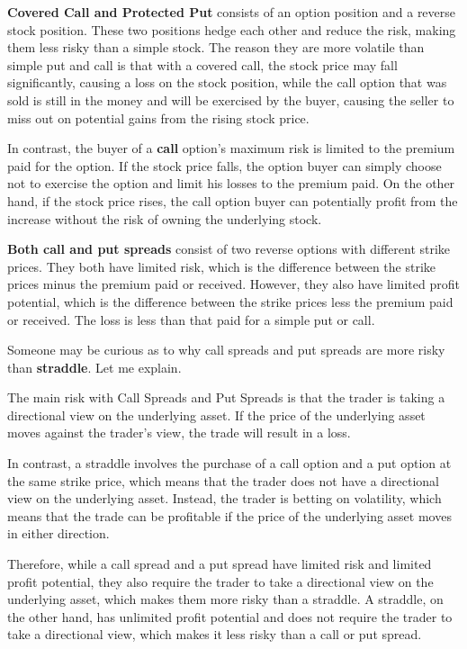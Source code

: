 \documentclass[11pt,en]{elegantpaper}
\begin{document}
\textbf{Covered Call and Protected Put} consists of an option position and a reverse stock position. These two positions hedge each other and reduce the risk, making them less risky than a simple stock. The reason they are more volatile than simple put and call is that with a covered call, the stock price may fall significantly, causing a loss on the stock position, while the call option that was sold is still in the money and will be exercised by the buyer, causing the seller to miss out on potential gains from the rising stock price.

In contrast, the buyer of a \textbf{call} option's maximum risk is limited to the premium paid for the option. If the stock price falls, the option buyer can simply choose not to exercise the option and limit his losses to the premium paid. On the other hand, if the stock price rises, the call option buyer can potentially profit from the increase without the risk of owning the underlying stock.

\textbf{Both call and put spreads} consist of two reverse options with different strike prices. They both have limited risk, which is the difference between the strike prices minus the premium paid or received. However, they also have limited profit potential, which is the difference between the strike prices less the premium paid or received. The loss is less than that paid for a simple put or call. 

Someone may be curious as to why call spreads and put spreads are more risky than \textbf{straddle}. Let me explain. 

The main risk with Call Spreads and Put Spreads is that the trader is taking a directional view on the underlying asset. If the price of the underlying asset moves against the trader's view, the trade will result in a loss. 

In contrast, a straddle involves the purchase of a call option and a put option at the same strike price, which means that the trader does not have a directional view on the underlying asset. Instead, the trader is betting on volatility, which means that the trade can be profitable if the price of the underlying asset moves in either direction.

Therefore, while a call spread and a put spread have limited risk and limited profit potential, they also require the trader to take a directional view on the underlying asset, which makes them more risky than a straddle. A straddle, on the other hand, has unlimited profit potential and does not require the trader to take a directional view, which makes it less risky than a call or put spread.
\end{document}
